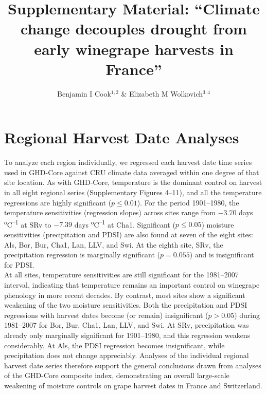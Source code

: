\documentclass[12pt]{article}
\title{Supplementary Material: 
``Climate change decouples drought from early winegrape harvests in France''}
\author{Benjamin I Cook$^{1,2}$ \& Elizabeth M Wolkovich$^{3,4}$}
\begin{document}
\maketitle

\section*{Regional Harvest Date Analyses}
\noindent To analyze each region individually, we regressed each harvest date time series used in GHD-Core against CRU climate data averaged within one degree of that site location. As with GHD-Core, temperature is the dominant control on harvest in all eight regional series (Supplementary Figures 4--11), and all the temperature regressions are highly significant ($p\le0.01$). For the period 1901--1980, the temperature sensitivities (regression slopes) across sites range from $-3.70$ days \textsuperscript{o}C\textsuperscript{--1} at SRv to $-7.39$ days \textsuperscript{o}C\textsuperscript{--1} at Cha1. Significant ($p\le0.05$) moisture sensitivities (precipitation and PDSI) are also found at seven of the eight sites: Als, Bor, Bur, Cha1, Lan, LLV, and Swi. At the eighth site, SRv, the precipitation regression is marginally significant ($p=0.055$) and is insignificant for PDSI.\\
\indent At all sites, temperature sensitivities are still significant for the 1981--2007 interval, indicating that temperature remains an important control on winegrape phenology in more recent decades. By contrast, most sites show a significant weakening of the two moisture sensitivities. Both the precipitation and PDSI regressions with harvest dates become (or remain) insignificant ($p>0.05$) during 1981--2007 for Bor, Bur, Cha1, Lan, LLV, and Swi. At SRv, precipitation was already only marginally significant for 1901--1980, and this regression weakens considerably. At Als, the PDSI regression becomes insignificant, while precipitation does not change appreciably. Analyses of the individual regional harvest date series therefore support the general conclusions drawn from analyses of the GHD-Core composite index, demonstrating an overall large-scale weakening of moisture controls on grape harvest dates in France and Switzerland.
\end{document}
